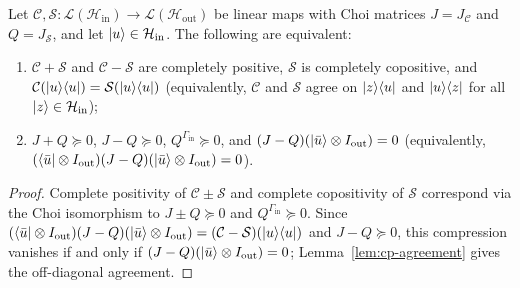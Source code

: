 \begin{lemma}
\label{lem:choi-cert}
\leanok
{}
Let $\mathcal{C}, \mathcal{S} : \mathcal{L}(\mathcal{H}_{\mathrm{in}}) \to \mathcal{L}(\mathcal{H}_{\mathrm{out}})$ be linear maps with Choi matrices $J = J_{\mathcal{C}}$ and $Q = J_{\mathcal{S}}$, and let $|u\rangle\in\mathcal{H}_{\mathrm{in}}$. The following are equivalent:
\begin{enumerate}
  \item $\mathcal{C}+\mathcal{S}$ and $\mathcal{C}-\mathcal{S}$ are completely positive, $\mathcal{S}$ is completely copositive, and $\mathcal{C}(|u\rangle\langle u|) = \mathcal{S}(|u\rangle\langle u|)$ (equivalently, $\mathcal{C}$ and $\mathcal{S}$ agree on $|z\rangle\langle u|$ and $|u\rangle\langle z|$ for all $|z\rangle\in\mathcal{H}_{\mathrm{in}}$);
  \item $J+Q\succeq 0$, $J-Q\succeq 0$, $Q^{\Gamma_{\mathrm{in}}}\succeq 0$, and $(J-Q)(|\bar{u}\rangle\otimes I_{\mathrm{out}}) = 0$ (equivalently, $(\langle \bar{u}|\otimes I_{\mathrm{out}})(J-Q)(|\bar{u}\rangle\otimes I_{\mathrm{out}}) = 0$).
\end{enumerate}
\end{lemma}
\begin{proof}
\leanok
Complete positivity of $\mathcal{C}\pm\mathcal{S}$ and complete copositivity of $\mathcal{S}$ correspond via the Choi isomorphism to $J\pm Q\succeq 0$ and $Q^{\Gamma_{\mathrm{in}}}\succeq 0$. Since $(\langle \bar{u}|\otimes I_{\mathrm{out}})(J-Q)(|\bar{u}\rangle\otimes I_{\mathrm{out}}) = (\mathcal{C}-\mathcal{S})(|u\rangle\langle u|)$ and $J-Q\succeq 0$, this compression vanishes if and only if $(J-Q)(|\bar{u}\rangle\otimes I_{\mathrm{out}}) = 0$; Lemma~\ref{lem:cp-agreement} gives the off-diagonal agreement.
\end{proof}

